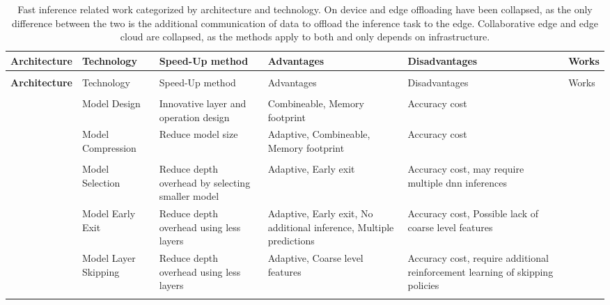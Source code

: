 \begin{minipage}[t]{\linewidth}
\begin{scriptsize}
\begin{longtabu}{>{\bfseries}X[0.8c]|X[c]|X[c]|X[c]|X[c]|X[c]}
	\caption[Fast Inference Related Work]{Fast inference related work categorized by architecture and technology. On device and edge offloading have been collapsed, as the only difference between the two is the additional communication of data to offload the inference task to the edge. Collaborative edge and edge cloud are collapsed, as the methods apply to both and only depends on infrastructure.} \label{tbl:fast-inference} \\
	\toprule
	\rowfont{\bfseries}
	Architecture & Technology & Speed-Up method & Advantages & Disadvantages & Works \tabularnewline
	\hline
	\endfirsthead
	\\
	\toprule
	\rowfont{\bfseries}
	Architecture & Technology & Speed-Up method & Advantages & Disadvantages & Works \tabularnewline
	\hline
	\endhead %
	\hline
	\\
	\endfoot
	\hline
	\endlastfoot
	  & Model Design & Innovative layer and operation design & Combineable, Memory footprint  & Accuracy cost & \cite{iandola_squeezenet:_2016,howard_mobilenets:_2017,sandler_mobilenetv2:_2018, zhang_shufflenet:_2017, ma_shufflenet_2018} \tabularnewline
	
	& Model Compression & Reduce model size & Adaptive, Combineable, Memory footprint & Accuracy cost &  \cite{hinton_distilling_2015,courbariaux_binaryconnect:_2015,courbariaux_binarized_2016,romero_fitnets:_2014} \tabularnewline	
	& & & & & \tabularnewline
	
	& Model Selection & Reduce depth overhead by selecting smaller model & Adaptive, Early exit & Accuracy cost, may require multiple \gls{dnn} inferences & \cite{bolukbasi_adaptive_2017} \tabularnewline
	
	& Model Early Exit & Reduce depth overhead using less layers & Adaptive, Early exit, No additional inference, Multiple predictions & Accuracy cost, Possible lack of coarse level features & \cite{leroux_resource-constrained_2015,teerapittayanon_branchynet:_2016, berestizshevsky_sacrificing_2019, kaya_shallow-deep_nodate, huang_multi-scale_2017} \tabularnewline
	& Model Layer Skipping & Reduce depth overhead using less layers & Adaptive, Coarse level features & Accuracy cost, require additional reinforcement learning of skipping policies & \cite{wang_skipnet:_2017,wu_blockdrop:_2017} \tabularnewline{}


\end{longtabu}
\end{scriptsize}
\end{minipage}
